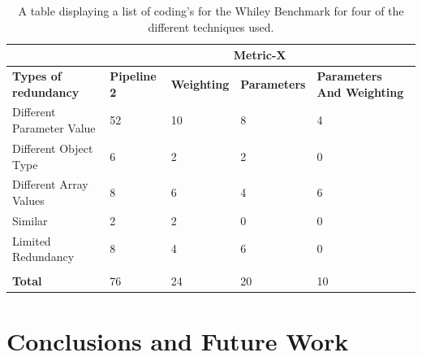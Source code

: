\documentclass[11pt
              , a4paper
              , twoside
              , openright
              ]{report}
\begin{document}
\begin{table}[]
\centering
\begin{tabular}{|l|l|l|l|l|}
\hline
                             & \multicolumn{4}{c|}{\textbf{Metric-X}}                                                              \\ \hline
\textbf{Types of redundancy} & \textbf{Pipeline 2} & \textbf{Weighting} & \textbf{Parameters} & \textbf{Parameters  And Weighting} \\ \hline
Different Parameter Value    & 52                  & 10                 & 8                   & 4                                  \\ \hline
Different Object Type        & 6                   & 2                  & 2                   & 0                                  \\ \hline
Different Array Values       & 8                   & 6                  & 4                   & 6                                  \\ \hline
Similar                      & 2                   & 2                  & 0                   & 0                                  \\ \hline
Limited Redundancy           & 8                   & 4                  & 6                   & 0                                  \\ \hline
\textbf{}                    &                     &                    &                     &                                    \\ \hline
\textbf{Total}               & 76                  & 24                 & 20                  & 10                                 \\ \hline
\end{tabular}
\caption{A table displaying a list of coding's for the Whiley Benchmark for four of the different techniques used.}
\label{metriccoding}
\end{table}
 \newpage 
 \newpage \chapter{Conclusions and Future Work}\label{C:future}
\end{document}
